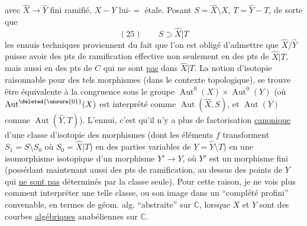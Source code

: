 avec $\widehat X\longrightarrow\widehat Y$ fini ramifié, $X\mathbin{-}Y$ lui-$=$ étale.
Posant $S=\widehat X\setminus X$, $T=\widehat Y-T$, de sorte que
\[
(25)\qquad S\supset\widehat X|T
\]
les ennuis techniques proviennent du fait que
l'on est obligé d'admettre que $\widehat X/\widehat Y$ puisse avoir des
pts de ramification effective non seulement en
des pts de $\widehat X|T$, mais aussi en des pts de $C$ qui
ne sont \uline{pas} dans $\widehat X|T$.
La notion d'isotopie raisonnable pour des
tels morphismes (dans le contexte topologique),
se trouve être équivalente à la congruence
sous le groupe $\operatorname{Aut}^0(X)\times\operatorname{Aut}^0(Y)$
(où $\operatorname{Aut}^{\deleted{\unsure{0}}}(X)$ est interprété comme $\operatorname{Aut}(\widehat X,S)$,
et $\operatorname{Aut}(Y)$ comme $\operatorname{Aut}(\widehat Y,T)$). L'ennui,
c'est qu'il n'y a plus de factorisation
\uline{canonique} d'une classe d'isotopie des
morphismes  (dont les éléments  $f$
transforment $S_1=S\setminus S_0$ où $S_0=\widehat X|T$) en
des parties variables de $Y=\widehat Y\setminus T$) en
une isomorphisme  isotopique  
 d'un morphisme $Y'\longrightarrow Y$, où $Y'$ est un
morphisme fini (possédant maintenant aussi
 des pts de ramification, au dessus des
points de $Y$ qui \uline{ne sont pas} déterminés
par la classe seule). Pour cette raison,
je ne vois plus comment interpréter une
telle classe, ou son image dans un
 ``complété profini'' convenable,
en termes de géom. alg. ``abstraite'' sur $\mathbb C$,
lorsque $X$ et $Y$ sont des courbes \uline{algébriques}
anabéliennes sur $\mathbb C$.

